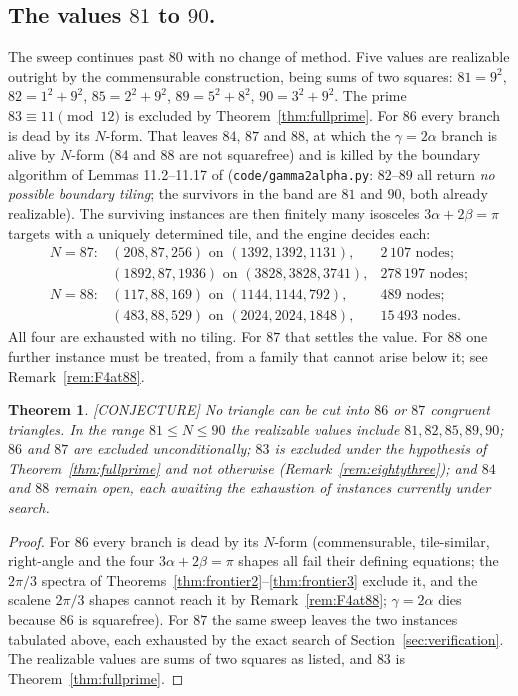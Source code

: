 \documentclass[11pt,reqno]{amsart}
\theoremstyle{plain}
\newtheorem{theorem}{Theorem}
\theoremstyle{definition}
\newcommand{\lab}[1]{\hfill\textnormal{\footnotesize\textsc{[#1]}}}
\begin{document}
\subsection*{The values $81$ to $90$.}
The sweep continues past $80$ with no change of method. Five values are realizable outright by the
commensurable construction, being sums of two squares: $81=9^2$, $82=1^2+9^2$, $85=2^2+9^2$,
$89=5^2+8^2$, $90=3^2+9^2$. The prime $83\equiv11\pmod{12}$ is excluded by
Theorem~\ref{thm:fullprime}. For $86$ every branch is dead by its $N$-form. That leaves $84$, $87$
and $88$, at which the $\gamma=2\alpha$ branch is alive by $N$-form ($84$ and $88$ are not
squarefree) and is killed by the boundary algorithm of Lemmas 11.2--11.17 of \cite{BeesonIso}
(\texttt{code/gamma2alpha.py}: $82$--$89$ all return \emph{no possible boundary tiling}; the
survivors in the band are $81$ and $90$, both already realizable). The surviving instances are then
finitely many isosceles $3\alpha+2\beta=\pi$ targets with a uniquely determined tile, and the engine
decides each:
\[
\begin{array}{llll}
N=87: & (208,87,256) \text{ on } (1392,1392,1131), & 2\,107 \text{ nodes}; \\
      & (1892,87,1936) \text{ on } (3828,3828,3741), & 278\,197 \text{ nodes};\\
N=88: & (117,88,169) \text{ on } (1144,1144,792), & 489 \text{ nodes}; \\
      & (483,88,529) \text{ on } (2024,2024,1848), & 15\,493 \text{ nodes}.
\end{array}
\]
All four are exhausted with no tiling. For $87$ that settles the value. For $88$ one further
instance must be treated, from a family that cannot arise below it; see
Remark~\ref{rem:F4at88}.

\begin{theorem}\label{thm:frontier5}\lab{CONJECTURE}
No triangle can be cut into $86$ or $87$ congruent triangles. In the range $81\le N\le 90$ the
realizable values include $81,82,85,89,90$; $86$ and $87$ are excluded unconditionally; $83$ is
excluded under the hypothesis of Theorem~\ref{thm:fullprime} and not otherwise
(Remark~\ref{rem:eightythree}); and $84$ and $88$ remain open, each awaiting the exhaustion of
instances currently under search.
\end{theorem}
\begin{proof}
For $86$ every branch is dead by its $N$-form (commensurable, tile-similar, right-angle and the four
$3\alpha+2\beta=\pi$ shapes all fail their defining equations; the $2\pi/3$ spectra of
Theorems~\ref{thm:frontier2}--\ref{thm:frontier3} exclude it, and the scalene $2\pi/3$ shapes cannot
reach it by Remark~\ref{rem:F4at88}; $\gamma=2\alpha$ dies because $86$ is squarefree). For $87$ the
same sweep leaves the two instances tabulated above, each exhausted by the exact search of
Section~\ref{sec:verification}. The realizable values are sums of two squares as listed, and $83$ is
Theorem~\ref{thm:fullprime}.
\end{proof}
\end{document}
